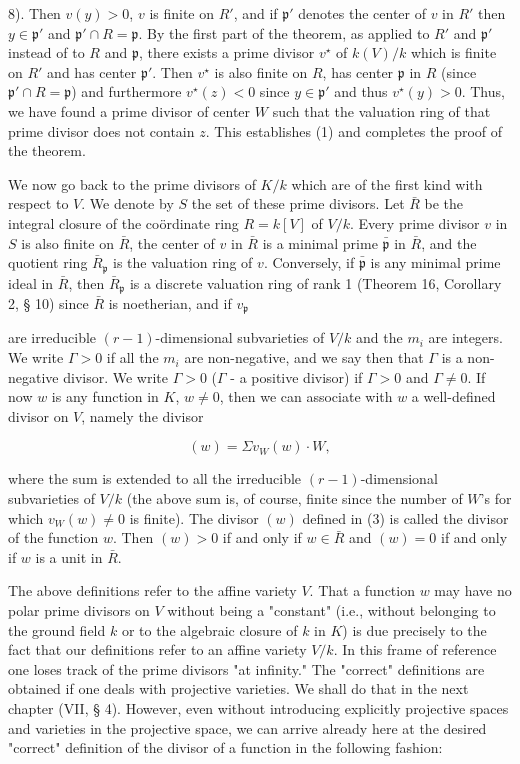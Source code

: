 8). Then $v(y) > 0$, $v$ is finite on $R'$, and if $\mathfrak{p}'$ denotes the center of $v$ in $R'$ then $y \in \mathfrak{p}'$ and $\mathfrak{p}' \cap R = \mathfrak{p}$. By the first part of the theorem, as applied to $R'$ and $\mathfrak{p}'$ instead of to $R$ and $\mathfrak{p}$, there exists a prime divisor $v^\star$ of $k(V)/k$ which is finite on $R'$ and has center $\mathfrak{p}'$. Then $v^\star$ is also finite on $R$, has center $\mathfrak{p}$ in $R$ (since $\mathfrak{p}' \cap R = \mathfrak{p}$) and furthermore $v^\star(z) < 0$ since $y \in \mathfrak{p}'$ and thus $v^\star(y) > 0$. Thus, we have found a prime divisor of center $W$ such that the valuation ring of that prime divisor does not contain $z$. This establishes (1) and completes the proof of the theorem.

We now go back to the prime divisors of $K/k$ which are of the first kind with respect to $V$. We denote by $S$ the set of these prime divisors. Let $\bar{R}$ be the integral closure of the coördinate ring $R = k[V]$ of $V/k$. Every prime divisor $v$ in $S$ is also finite on $\bar{R}$, the center of $v$ in $\bar{R}$ is a minimal prime $\bar{\mathfrak{p}}$ in $\bar{R}$, and the quotient ring $\bar{R}_\mathfrak{p}$ is the valuation ring of $v$. Conversely, if $\bar{\mathfrak{p}}$ is any minimal prime ideal in $\bar{R}$, then $\bar{R}_\mathfrak{p}$ is a discrete valuation ring of rank 1 (Theorem 16, Corollary 2, § 10) since $\bar{R}$ is noetherian, and if $v_\mathfrak{p}$

are irreducible $(r-1)$-dimensional subvarieties of $V/k$ and the $m_i$ are integers. We write $\Gamma > 0$ if all the $m_i$ are non-negative, and we say then that $\Gamma$ is a non-negative divisor. We write $\Gamma > 0$ ($\Gamma$ - a positive divisor) if $\Gamma > 0$ and $\Gamma \neq 0$. If now $w$ is any function in $K$, $w \neq 0$, then we can associate with $w$ a well-defined divisor on $V$, namely the divisor

$$(w) = \Sigma v_W(w) \cdot W,$$

where the sum is extended to all the irreducible $(r-1)$-dimensional subvarieties of $V/k$ (the above sum is, of course, finite since the number of $W$'s for which $v_W(w) \neq 0$ is finite). The divisor $(w)$ defined in (3) is called the divisor of the function $w$. Then $(w) > 0$ if and only if $w \in \bar{R}$ and $(w) = 0$ if and only if $w$ is a unit in $\bar{R}$.

The above definitions refer to the affine variety $V$. That a function $w$ may have no polar prime divisors on $V$ without being a "constant" (i.e., without belonging to the ground field $k$ or to the algebraic closure of $k$ in $K$) is due precisely to the fact that our definitions refer to an affine variety $V/k$. In this frame of reference one loses track of the prime divisors "at infinity." The "correct" definitions are obtained if one deals with projective varieties. We shall do that in the next chapter (VII, § 4). However, even without introducing explicitly projective spaces and varieties in the projective space, we can arrive already here at the desired "correct" definition of the divisor of a function in the following fashion:

